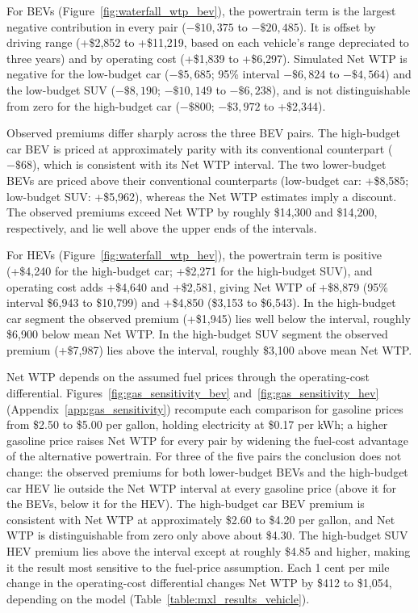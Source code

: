 \documentclass[a4paper,fleqn]{cas-sc}   %
\begin{document}
For BEVs (Figure~\ref{fig:waterfall_wtp_bev}), the powertrain term is the largest negative contribution in every pair ($-\$10,375$ to $-\$20,485$). It is offset by driving range (+\$2,852 to +\$11,219, based on each vehicle's range depreciated to three years) and by operating cost (+\$1,839 to +\$6,297). Simulated Net WTP is negative for the low-budget car ($-\$5,685$; 95\% interval $-\$6,824$ to $-\$4,564$) and the low-budget SUV ($-\$8,190$; $-\$10,149$ to $-\$6,238$), and is not distinguishable from zero for the high-budget car ($-\$800$; $-\$3,972$ to +\$2,344).

Observed premiums differ sharply across the three BEV pairs. The high-budget car BEV is priced at approximately parity with its conventional counterpart ($-\$68$), which is consistent with its Net WTP interval. The two lower-budget BEVs are priced above their conventional counterparts (low-budget car: +\$8,585; low-budget SUV: +\$5,962), whereas the Net WTP estimates imply a discount. The observed premiums exceed Net WTP by roughly \$14,300 and \$14,200, respectively, and lie well above the upper ends of the intervals.

For HEVs (Figure~\ref{fig:waterfall_wtp_hev}), the powertrain term is positive (+\$4,240 for the high-budget car; +\$2,271 for the high-budget SUV), and operating cost adds +\$4,640 and +\$2,581, giving Net WTP of +\$8,879 (95\% interval \$6,943 to \$10,799) and +\$4,850 (\$3,153 to \$6,543). In the high-budget car segment the observed premium (+\$1,945) lies well below the interval, roughly \$6,900 below mean Net WTP. In the high-budget SUV segment the observed premium (+\$7,987) lies above the interval, roughly \$3,100 above mean Net WTP.

Net WTP depends on the assumed fuel prices through the operating-cost differential. Figures~\ref{fig:gas_sensitivity_bev} and~\ref{fig:gas_sensitivity_hev} (Appendix~\ref{app:gas_sensitivity}) recompute each comparison for gasoline prices from \$2.50 to \$5.00 per gallon, holding electricity at \$0.17 per kWh; a higher gasoline price raises Net WTP for every pair by widening the fuel-cost advantage of the alternative powertrain. For three of the five pairs the conclusion does not change: the observed premiums for both lower-budget BEVs and the high-budget car HEV lie outside the Net WTP interval at every gasoline price (above it for the BEVs, below it for the HEV). The high-budget car BEV premium is consistent with Net WTP at approximately \$2.60 to \$4.20 per gallon, and Net WTP is distinguishable from zero only above about \$4.30. The high-budget SUV HEV premium lies above the interval except at roughly \$4.85 and higher, making it the result most sensitive to the fuel-price assumption. Each 1 cent per mile change in the operating-cost differential changes Net WTP by \$412 to \$1,054, depending on the model (Table~\ref{table:mxl_results_vehicle}).
\end{document}
